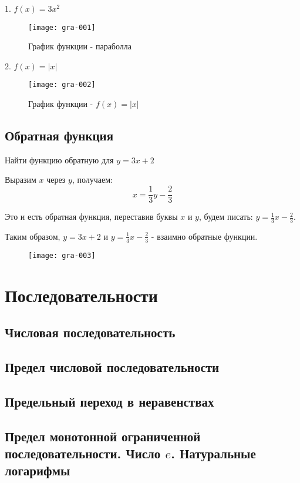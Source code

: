 \documentclass[14pt]{extreport}
\begin{document}
1. $f(x)=3x^2$
\begin{figure}[H]
\centerline{\texttt{[image: gra-001]}}
\caption{График функции - параболла}
\label{fig12}
\end{figure}

2. $f(x)=|x|$
\begin{figure}[H]
\centerline{\texttt{[image: gra-002]}}
\caption{График функции - $f(x)=|x|$}
\label{fig13}
\end{figure}

\section{Обратная функция}

Найти функцию обратную для $y=3x+2$

Выразим $x$ через $y$, получаем: 
\begin{equation}
x = \frac{1}{3}y-\frac{2}{3} 
\end{equation}

Это и есть обратная функция, переставив буквы $x$ и $y$, будем писать: $y=\frac{1}{3}x-\frac{2}{3}$.

Таким образом, $y=3x+2$ и $y=\frac{1}{3}x-\frac{2}{3}$ - взаимно обратные функции.
\begin{figure}[H]
\centerline{\texttt{[image: gra-003]}}
\caption{}
\label{fig14}
\end{figure}
 



\chapter{Последовательности}

\section{Числовая последовательность}

\section{Предел числовой последовательности}

\section{Предельный переход в неравенствах}

\section{Предел монотонной ограниченной последовательности. Число $e$. Натуральные логарифмы}
\end{document}
